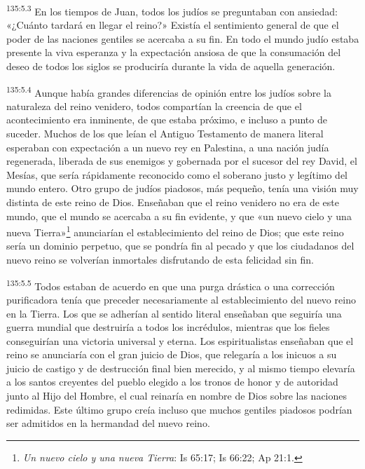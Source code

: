 \par
\textsuperscript{135:5.3} En los tiempos de Juan, todos los judíos se preguntaban con ansiedad: «¿Cuánto tardará en llegar el reino?» Existía el sentimiento general de que el poder de las naciones gentiles se acercaba a su fin. En todo el mundo judío estaba presente la viva esperanza y la expectación ansiosa de que la consumación del deseo de todos los siglos se produciría durante la vida de aquella generación.

\par
\textsuperscript{135:5.4} Aunque había grandes diferencias de opinión entre los judíos sobre la naturaleza del reino venidero, todos compartían la creencia de que el acontecimiento era inminente, de que estaba próximo, e incluso a punto de suceder. Muchos de los que leían el Antiguo Testamento de manera literal esperaban con expectación a un nuevo rey en Palestina, a una nación judía regenerada, liberada de sus enemigos y gobernada por el sucesor del rey David, el Mesías, que sería rápidamente reconocido como el soberano justo y legítimo del mundo entero. Otro grupo de judíos piadosos, más pequeño, tenía una visión muy distinta de este reino de Dios. Enseñaban que el reino venidero no era de este mundo, que el mundo se acercaba a su fin evidente, y que «un nuevo cielo y una nueva Tierra»\footnote{\textit{Un nuevo cielo y una nueva Tierra}: Is 65:17; Is 66:22; Ap 21:1.} anunciarían el establecimiento del reino de Dios; que este reino sería un dominio perpetuo, que se pondría fin al pecado y que los ciudadanos del nuevo reino se volverían inmortales disfrutando de esta felicidad sin fin.

\par
\textsuperscript{135:5.5} Todos estaban de acuerdo en que una purga drástica o una corrección purificadora tenía que preceder necesariamente al establecimiento del nuevo reino en la Tierra. Los que se adherían al sentido literal enseñaban que seguiría una guerra mundial que destruiría a todos los incrédulos, mientras que los fieles conseguirían una victoria universal y eterna. Los espiritualistas enseñaban que el reino se anunciaría con el gran juicio de Dios, que relegaría a los inicuos a su juicio de castigo y de destrucción final bien merecido, y al mismo tiempo elevaría a los santos creyentes del pueblo elegido a los tronos de honor y de autoridad junto al Hijo del Hombre, el cual reinaría en nombre de Dios sobre las naciones redimidas. Este último grupo creía incluso que muchos gentiles piadosos podrían ser admitidos en la hermandad del nuevo reino.

